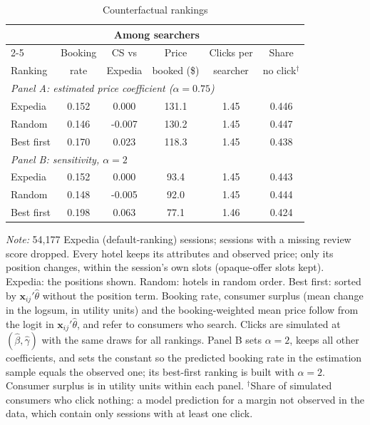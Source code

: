 \begin{table}[htbp]
\centering
\caption{Counterfactual rankings}
\label{tab:rankings}
\small
\setlength{\tabcolsep}{5pt}
\begin{tabular}{lccccc}
\toprule
 & \multicolumn{4}{c}{Among searchers} & \\
\cmidrule(lr){2-5}
 & Booking & CS vs & Price & Clicks per & Share \\
Ranking & rate & Expedia & booked (\$) & searcher & no click$^{\dagger}$ \\
\midrule
\multicolumn{6}{l}{\textit{Panel A: estimated price coefficient ($\alpha = 0.75$)}} \\
Expedia & 0.152 & 0.000 & 131.1 & 1.45 & 0.446 \\
Random & 0.146 & -0.007 & 130.2 & 1.45 & 0.447 \\
Best first & 0.170 & 0.023 & 118.3 & 1.45 & 0.438 \\
\midrule
\multicolumn{6}{l}{\textit{Panel B: sensitivity, $\alpha = 2$}} \\
Expedia & 0.152 & 0.000 & 93.4 & 1.45 & 0.443 \\
Random & 0.148 & -0.005 & 92.0 & 1.45 & 0.444 \\
Best first & 0.198 & 0.063 & 77.1 & 1.46 & 0.424 \\
\bottomrule
\end{tabular}

\begin{minipage}{0.85\linewidth}\vspace{4pt}\footnotesize \textit{Note:} 54,177 Expedia (default-ranking) sessions; sessions with a missing review score dropped. Every hotel keeps its attributes and observed price; only its position changes, within the session's own slots (opaque-offer slots kept). Expedia: the positions shown. Random: hotels in random order. Best first: sorted by $\mathbf{x}_{ij}'\hat\theta$ without the position term. Booking rate, consumer surplus (mean change in the logsum, in utility units) and the booking-weighted mean price follow from the logit in $\mathbf{x}_{ij}'\hat\theta$, and refer to consumers who search. Clicks are simulated at $(\hat\beta, \hat\gamma)$ with the same draws for all rankings. Panel B sets $\alpha = 2$, keeps all other coefficients, and sets the constant so the predicted booking rate in the estimation sample equals the observed one; its best-first ranking is built with $\alpha = 2$. Consumer surplus is in utility units within each panel. $^{\dagger}$Share of simulated consumers who click nothing: a model prediction for a margin not observed in the data, which contain only sessions with at least one click.\end{minipage}
\end{table}
